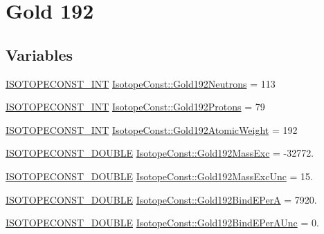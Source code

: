 \hypertarget{group___isotope_const-_gold-_au192}{}\section{Gold 192}
\label{group___isotope_const-_gold-_au192}
\subsection*{Variables}
\begin{DoxyCompactItemize}
\item 
\mbox{\hyperlink{group___isotope_const-_macros_ga5f18360b3e99483a35c32d789e62621c}{I\+S\+O\+T\+O\+P\+E\+C\+O\+N\+S\+T\+\_\+\+I\+NT}} \mbox{\hyperlink{group___isotope_const-_gold-_au192_gac7d13b35cbe74e1ca7ebfd414c8b6a7d}{Isotope\+Const\+::\+Gold192\+Neutrons}} = 113
\item 
\mbox{\hyperlink{group___isotope_const-_macros_ga5f18360b3e99483a35c32d789e62621c}{I\+S\+O\+T\+O\+P\+E\+C\+O\+N\+S\+T\+\_\+\+I\+NT}} \mbox{\hyperlink{group___isotope_const-_gold-_au192_ga63263bf4079168f850ef614d5a8b2be6}{Isotope\+Const\+::\+Gold192\+Protons}} = 79
\item 
\mbox{\hyperlink{group___isotope_const-_macros_ga5f18360b3e99483a35c32d789e62621c}{I\+S\+O\+T\+O\+P\+E\+C\+O\+N\+S\+T\+\_\+\+I\+NT}} \mbox{\hyperlink{group___isotope_const-_gold-_au192_gad616e8b631beff61d65db1d896b7824d}{Isotope\+Const\+::\+Gold192\+Atomic\+Weight}} = 192
\item 
\mbox{\hyperlink{group___isotope_const-_macros_ga8f45a7272ce02c0b4c65c44636ed719a}{I\+S\+O\+T\+O\+P\+E\+C\+O\+N\+S\+T\+\_\+\+D\+O\+U\+B\+LE}} \mbox{\hyperlink{group___isotope_const-_gold-_au192_gac434cf6b7e641cd2578a258b30f99ae1}{Isotope\+Const\+::\+Gold192\+Mass\+Exc}} = -\/32772.
\item 
\mbox{\hyperlink{group___isotope_const-_macros_ga8f45a7272ce02c0b4c65c44636ed719a}{I\+S\+O\+T\+O\+P\+E\+C\+O\+N\+S\+T\+\_\+\+D\+O\+U\+B\+LE}} \mbox{\hyperlink{group___isotope_const-_gold-_au192_gac4e269b800e9a0c98aeb37fd1d95f07f}{Isotope\+Const\+::\+Gold192\+Mass\+Exc\+Unc}} = 15.
\item 
\mbox{\hyperlink{group___isotope_const-_macros_ga8f45a7272ce02c0b4c65c44636ed719a}{I\+S\+O\+T\+O\+P\+E\+C\+O\+N\+S\+T\+\_\+\+D\+O\+U\+B\+LE}} \mbox{\hyperlink{group___isotope_const-_gold-_au192_ga7b56fe91c3b5359b1eca72fb48429fa6}{Isotope\+Const\+::\+Gold192\+Bind\+E\+PerA}} = 7920.
\item 
\mbox{\hyperlink{group___isotope_const-_macros_ga8f45a7272ce02c0b4c65c44636ed719a}{I\+S\+O\+T\+O\+P\+E\+C\+O\+N\+S\+T\+\_\+\+D\+O\+U\+B\+LE}} \mbox{\hyperlink{group___isotope_const-_gold-_au192_gaba1601f8a39bef92b48d88a962008b02}{Isotope\+Const\+::\+Gold192\+Bind\+E\+Per\+A\+Unc}} = 0.

\end{DoxyCompactItemize}
